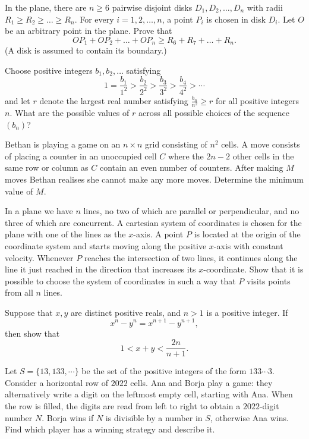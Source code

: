 \documentclass[11pt]{scrartcl}
\begin{document}
\begin{problem}[6654677204410680146]
In the plane, there are $n \geqslant 6$ pairwise disjoint disks $D_{1}, D_{2}, \ldots, D_{n}$ with radii $R_{1} \geqslant R_{2} \geqslant \ldots \geqslant R_{n}$. For every $i=1,2, \ldots, n$, a point $P_{i}$ is chosen in disk $D_{i}$. Let $O$ be an arbitrary point in the plane. Prove that\[O P_{1}+O P_{2}+\ldots+O P_{n} \geqslant R_{6}+R_{7}+\ldots+R_{n}.\](A disk is assumed to contain its boundary.)
\end{problem}
\begin{problem}[6666334949338369993]
	Choose positive integers $b_1, b_2, \dotsc$ satisfying
\[1=\frac{b_1}{1^2} > \frac{b_2}{2^2} > \frac{b_3}{3^2} > \frac{b_4}{4^2} > \dotsb\]and let $r$ denote the largest real number satisfying $\tfrac{b_n}{n^2} \geq r$ for all positive integers $n$. What are the possible values of $r$ across all possible choices of the sequence $(b_n)$?
\end{problem}
\begin{problem}[6702571883743406545]
Bethan is playing a game on an $n\times n$ grid consisting of $n^2$ cells. A move consists of placing a counter in an unoccupied cell $C$ where the $2n-2$ other cells in the same row or column as $C$ contain an even number of counters. After making $M$ moves Bethan realises she cannot make any more moves. Determine the minimum value of $M$.
\end{problem}
\begin{problem}[6703839677147050695]
	In a plane we have $n$ lines, no two of which are parallel or perpendicular, and no three of which are concurrent. A cartesian system of coordinates is chosen for the plane with one of the lines as the $x$-axis. A point $P$ is located at the origin of the coordinate system and starts moving along the positive $x$-axis with constant velocity. Whenever $P$ reaches the intersection of two lines, it continues along the line it just reached in the direction that increases its $x$-coordinate. Show that it is possible to choose the system of coordinates in such a way that $P$ visits points from all $n$ lines.
\end{problem}
\begin{problem}[6721454094634463277]
	Suppose that $x,y$ are distinct positive reals, and $n>1$ is a positive integer. If
\[x^n-y^n=x^{n+1}-y^{n+1},\]then show that
\[1<x+y<\frac{2n}{n+1}.\]
\end{problem}
\begin{problem}[6728439333021242021]
Let $S=\{13, 133, \cdots\}$ be the set of the positive integers of the form $133 \cdots 3$. Consider a horizontal row of $2022$ cells. Ana and Borja play a game: they alternatively write a digit on the leftmost empty cell, starting with Ana. When the row is filled, the digits are read from left to right to obtain a $2022$-digit number $N$. Borja wins if $N$ is divisible by a number in $S$, otherwise Ana wins. Find which player has a winning strategy and describe it.
\end{problem}
\end{document}
